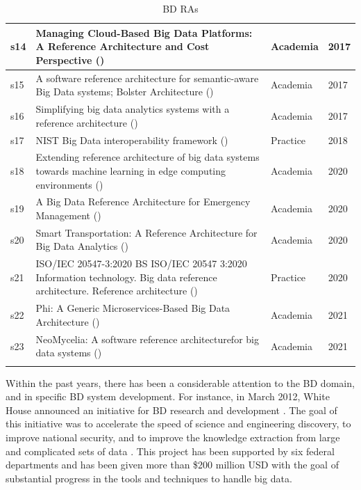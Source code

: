 \documentclass[review]{elsarticle}
\begin{document}
\begin{longtable}{ |p{0.5cm}|p{6.5cm}|p{1.5cm}|p{0.8cm}| }
    \hline
    s14 & Managing Cloud-Based Big Data Platforms: A Reference Architecture and Cost Perspective (\cite{heilig2017managing}) & Academia  &  2017   \\
    \hline
    s15 & A software reference architecture for semantic-aware Big Data systems; Bolster Architecture (\cite{Nadal}) & Academia  &  2017   \\
    \hline
    s16 & Simplifying big data analytics systems with a reference architecture (\cite{sang2017simplifying}) & Academia  &  2017   \\
    \hline
    s17 & NIST Big Data interoperability framework (\cite{Chang}) & Practice  &  2018  \\
    \hline
    s18 & Extending reference architecture of big data systems towards machine learning in edge computing environments (\cite{paakkonen2020extending})  & Academia & 2020   \\
    \hline
    s19 & A Big Data Reference Architecture for Emergency Management (\cite{iglesias2020big})  & Academia & 2020   \\
    \hline
    s20 & Smart Transportation: A Reference Architecture for Big Data Analytics (\cite{castellanos2021smart})  & Academia & 2020   \\
    \hline
    s21 & ISO/IEC 20547-3:2020 BS ISO/IEC 20547 3:2020 Information technology. Big data reference architecture. Reference architecture (\cite{ISO20547}) & Practice  &  2020  \\
    \hline
    s22 & Phi: A Generic Microservices-Based Big Data Architecture (\cite{maamouri2021phi})  & Academia & 2021   \\
    \hline
    s23 & NeoMycelia: A software reference architecturefor big data systems (\cite{AtaeiApsec})  & Academia & 2021   \\
    \hline
    \caption{BD RAs}
    \label{table:bdRAs}
\end{longtable}

Within the past years, there has been a considerable attention to the BD domain, and in specific BD system development. For instance, in March 2012, White House announced an initiative for BD research and development \cite{House}. The goal of this initiative was to accelerate the speed of science and engineering discovery, to improve national security, and to improve the knowledge extraction from large and complicated sets of data \cite{chang2015nist}. This project has been supported by six federal departments and has been given more than \$200 million USD with the goal of substantial progress in the tools and techniques to handle big data.
\end{document}

